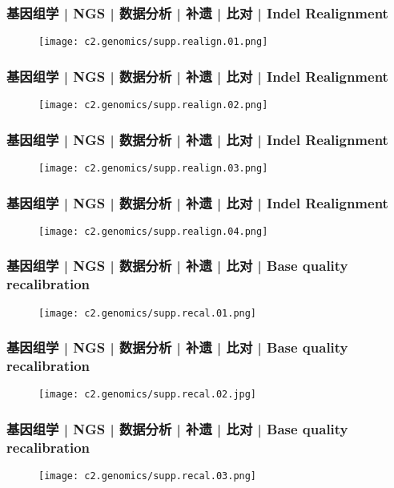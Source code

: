\begin{frame}
  \frametitle{基因组学 | NGS | 数据分析 | 补遗 | 比对 | Indel Realignment}
  \begin{figure}
    \centering
    \texttt{[image: c2.genomics/supp.realign.01.png]}
  \end{figure}
\end{frame}

\begin{frame}
  \frametitle{基因组学 | NGS | 数据分析 | 补遗 | 比对 | Indel Realignment}
  \begin{figure}
    \centering
    \texttt{[image: c2.genomics/supp.realign.02.png]}
  \end{figure}
\end{frame}

\begin{frame}
  \frametitle{基因组学 | NGS | 数据分析 | 补遗 | 比对 | Indel Realignment}
  \begin{figure}
    \centering
    \texttt{[image: c2.genomics/supp.realign.03.png]}
  \end{figure}
\end{frame}

\begin{frame}
  \frametitle{基因组学 | NGS | 数据分析 | 补遗 | 比对 | Indel Realignment}
  \begin{figure}
    \centering
    \texttt{[image: c2.genomics/supp.realign.04.png]}
  \end{figure}
\end{frame}

\begin{frame}
  \frametitle{基因组学 | NGS | 数据分析 | 补遗 | 比对 | Base quality recalibration}
  \begin{figure}
    \centering
    \texttt{[image: c2.genomics/supp.recal.01.png]}
  \end{figure}
\end{frame}

\begin{frame}
  \frametitle{基因组学 | NGS | 数据分析 | 补遗 | 比对 | Base quality recalibration}
  \begin{figure}
    \centering
    \texttt{[image: c2.genomics/supp.recal.02.jpg]}
  \end{figure}
\end{frame}

\begin{frame}
  \frametitle{基因组学 | NGS | 数据分析 | 补遗 | 比对 | Base quality recalibration}
  \begin{figure}
    \centering
    \texttt{[image: c2.genomics/supp.recal.03.png]}
  \end{figure}
\end{frame}

